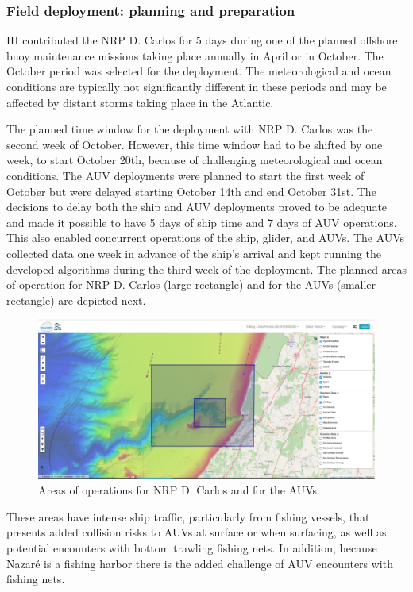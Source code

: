 \subsubsection{Field deployment: planning and preparation}

IH contributed the NRP D. Carlos for 5 days during one of the planned
offshore buoy maintenance missions taking place annually in April or in
October. The October period was selected for the \proj deployment. The
meteorological and ocean conditions are typically not significantly
different in these periods and may be affected by distant storms taking
place in the Atlantic.

The planned time window for the \proj deployment with NRP D. Carlos was
the second week of October. However, this time window had to be shifted
by one week, to start October 20th, because of challenging
meteorological and ocean conditions. The AUV deployments were planned to
start the first week of October but were delayed starting October 14th
and end October 31st. The decisions to delay both the ship and AUV
deployments proved to be adequate and made it possible to have 5 days of
ship time and 7 days of AUV operations. This also enabled concurrent
operations of the ship, glider, and AUVs. The AUVs collected data one
week in advance of the ship’s arrival and kept running the developed
algorithms during the third week of the deployment. The planned areas of
operation for NRP D. Carlos (large rectangle) and for the AUVs (smaller
rectangle) are depicted next.

\begin{figure}
    \centering
    \includegraphics[width=.7\linewidth]{fig/Opareaas.png}
    \caption{Areas of operations for NRP D. Carlos and for the AUVs.}
    \label{fig:opareas}
\end{figure}

These areas have intense ship traffic, particularly from fishing
vessels, that presents added collision risks to AUVs at surface or when
surfacing, as well as potential encounters with bottom trawling fishing
nets. In addition, because Nazaré is a fishing harbor there is the added
challenge of AUV encounters with fishing nets.

